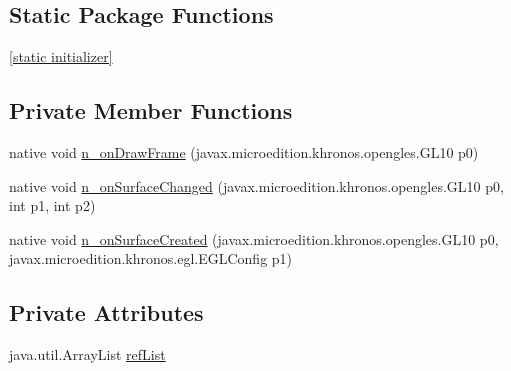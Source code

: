 \subsection*{Static Package Functions}
\begin{CompactItemize}
\item 
\hyperlink{classmd5b60ffeb829f638581ab2bb9b1a7f4f3f_1_1_open_g_l_view_renderer___renderer_1da155ccbc8f1eebe8a153be7e5c7c23}{\mbox{[}static initializer\mbox{]}}
\end{CompactItemize}
\subsection*{Private Member Functions}
\begin{CompactItemize}
\item 
native void \hyperlink{classmd5b60ffeb829f638581ab2bb9b1a7f4f3f_1_1_open_g_l_view_renderer___renderer_3af06f69ccb22603343385f0e693a327}{n\_\-onDrawFrame} (javax.microedition.khronos.opengles.GL10 p0)
\item 
native void \hyperlink{classmd5b60ffeb829f638581ab2bb9b1a7f4f3f_1_1_open_g_l_view_renderer___renderer_b404219aa1e0f1148bdd25b396a3786a}{n\_\-onSurfaceChanged} (javax.microedition.khronos.opengles.GL10 p0, int p1, int p2)
\item 
native void \hyperlink{classmd5b60ffeb829f638581ab2bb9b1a7f4f3f_1_1_open_g_l_view_renderer___renderer_87979e2a4ae2dc823ee0edb8db6bf71a}{n\_\-onSurfaceCreated} (javax.microedition.khronos.opengles.GL10 p0, javax.microedition.khronos.egl.EGLConfig p1)
\end{CompactItemize}
\subsection*{Private Attributes}
\begin{CompactItemize}
\item 
java.util.ArrayList \hyperlink{classmd5b60ffeb829f638581ab2bb9b1a7f4f3f_1_1_open_g_l_view_renderer___renderer_f3d20851f4298900dc6d33f721cb582e}{refList}
\end{CompactItemize}


